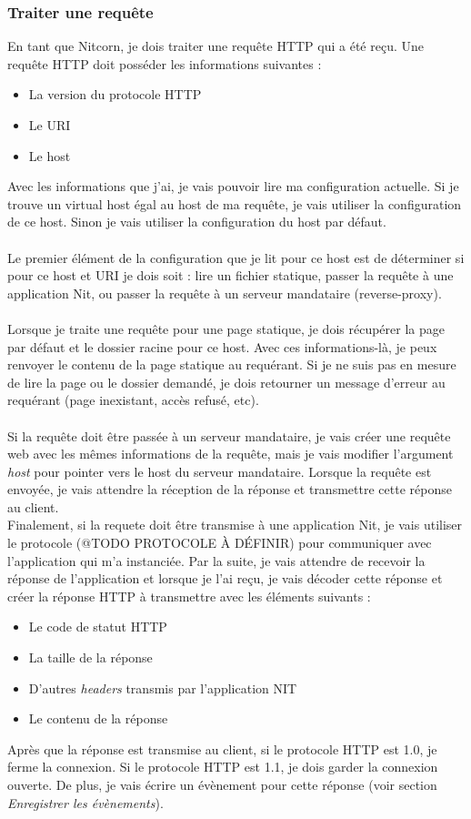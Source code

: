 \documentclass{scrreprt}
\begin{document}
\subsubsection{Traiter une requête}
En tant que Nitcorn, je dois traiter une requête HTTP qui a été reçu. Une requête
HTTP doit posséder les informations suivantes :
\begin{itemize}
    \item La version du protocole HTTP
    \item Le URI
    \item Le host
\end{itemize}

Avec les informations que j'ai, je vais pouvoir lire ma configuration actuelle. Si
je trouve un virtual host égal au host de ma requête, je vais utiliser la configuration
de ce host. Sinon je vais utiliser la configuration du host par défaut. \\
\\
Le premier élément de la configuration que je lit pour ce host est de déterminer
si pour ce host et URI je dois soit : lire un fichier statique, passer la requête
à une application Nit, ou passer la requête à un serveur mandataire (reverse-proxy).\\
\\
Lorsque je traite une requête pour une page statique, je dois récupérer la page par
défaut et le dossier racine pour ce host. Avec ces informations-là, je peux renvoyer
le contenu de la page statique au requérant. Si je ne suis pas en mesure de lire
la page ou le dossier demandé, je dois retourner un message d'erreur au requérant
(page inexistant, accès refusé, etc).\\
\\
Si la requête doit être passée à un serveur mandataire, je vais créer
une requête web avec les mêmes informations de la requête, mais je vais modifier
l'argument \textit{host} pour pointer vers le host du serveur mandataire. Lorsque
la requête est envoyée, je vais attendre la réception de la réponse et transmettre
cette réponse au client.
\\
Finalement, si la requete doit être transmise à une application Nit, je vais utiliser
le protocole (@TODO PROTOCOLE À DÉFINIR) pour communiquer avec l'application
qui m'a instanciée. Par la suite, je vais attendre de recevoir la réponse de l'application
et lorsque je l'ai reçu, je vais décoder cette réponse et créer la réponse HTTP
à transmettre avec les éléments suivants :
\begin{itemize}
    \item Le code de statut HTTP
    \item La taille de la réponse
    \item D'autres \textit{headers} transmis par l'application NIT
    \item Le contenu de la réponse
\end{itemize}
Après que la réponse est transmise au client, si le protocole HTTP est 1.0, je ferme
la connexion. Si le protocole HTTP est 1.1, je dois garder la connexion
ouverte. De plus, je vais écrire un évènement pour cette réponse (voir section
\textit{Enregistrer les évènements}).
\end{document}
